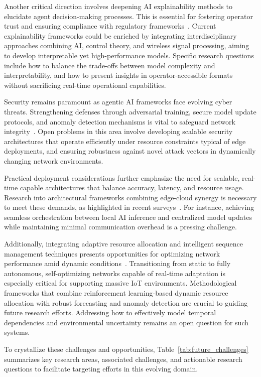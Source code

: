 \documentclass[sigconf]{acmart}
\begin{document}
Another critical direction involves deepening AI explainability methods to elucidate agent decision-making processes. This is essential for fostering operator trust and ensuring compliance with regulatory frameworks~\cite{ref48}. Current explainability frameworks could be enriched by integrating interdisciplinary approaches combining AI, control theory, and wireless signal processing, aiming to develop interpretable yet high-performance models. Specific research questions include how to balance the trade-offs between model complexity and interpretability, and how to present insights in operator-accessible formats without sacrificing real-time operational capabilities.

Security remains paramount as agentic AI frameworks face evolving cyber threats. Strengthening defenses through adversarial training, secure model update protocols, and anomaly detection mechanisms is vital to safeguard network integrity~\cite{ref50}. Open problems in this area involve developing scalable security architectures that operate efficiently under resource constraints typical of edge deployments, and ensuring robustness against novel attack vectors in dynamically changing network environments.

Practical deployment considerations further emphasize the need for scalable, real-time capable architectures that balance accuracy, latency, and resource usage. Research into architectural frameworks combining edge-cloud synergy is necessary to meet these demands, as highlighted in recent surveys~\cite{ref50}. For instance, achieving seamless orchestration between local AI inference and centralized model updates while maintaining minimal communication overhead is a pressing challenge.

Additionally, integrating adaptive resource allocation and intelligent sequence management techniques presents opportunities for optimizing network performance amid dynamic conditions~\cite{ref21}. Transitioning from static to fully autonomous, self-optimizing networks capable of real-time adaptation is especially critical for supporting massive IoT environments. Methodological frameworks that combine reinforcement learning-based dynamic resource allocation with robust forecasting and anomaly detection are crucial to guiding future research efforts. Addressing how to effectively model temporal dependencies and environmental uncertainty remains an open question for such systems.

To crystallize these challenges and opportunities, Table~\ref{tab:future_challenges} summarizes key research areas, associated challenges, and actionable research questions to facilitate targeting efforts in this evolving domain.
\end{document}
